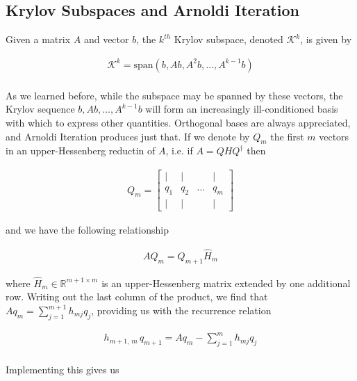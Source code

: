 \documentclass[11pt]{article}
\newcommand{\K}[1]{\mathcal{K}^{#1}}
\newcommand{\Rmn}[2]{\mathbb{R}^{#1 \times #2}}
\begin{document}
\subsection{Krylov Subspaces and Arnoldi Iteration}

Given a matrix $A$ and vector $b$, the $k^{th}$ Krylov subspace, denoted $\K{k}$, is given by

\begin{align*}
  \K{k} = \textrm{span}(b, Ab, A^2b, \hdots, A^{k-1}b) \\
\end{align*}

As we learned before, while the subspace may be spanned by these vectors, the Krylov sequence $b, Ab, \hdots, A^{k-1}b$ will form an increasingly ill-conditioned basis with which to express other quantities. Orthogonal bases are always appreciated, and Arnoldi Iteration produces just that. If we denote by $Q_m$ the first $m$ vectors in an upper-Hessenberg reductin of $A$, i.e. if $A = QHQ^\dagger$ then

\begin{align*}
  Q_m = \begin{bmatrix} | & | & & | \\ q_1 & q_2 & \hdots & q_m \\ | & | & & | \end{bmatrix}
\end{align*}

and we have the following relationship

\begin{align*}
  AQ_m = Q_{m+1} \hat{H}_m
\end{align*}

where $\hat{H}_m \in \Rmn{m+1}{m}$ is an upper-Hessenberg matrix extended by one additional row. Writing out the last column of the product, we find that $Aq_m = \sum \limits_{j=1}^{m+1} h_{mj} q_j $, providing us with the recurrence relation

\begin{align*}
  h_{m+1, \, m} \, q_{m+1} = Aq_m - \sum \limits_{j=1}^m h_{mj} q_j \\
\end{align*}

Implementing this gives us \\
\end{document}
